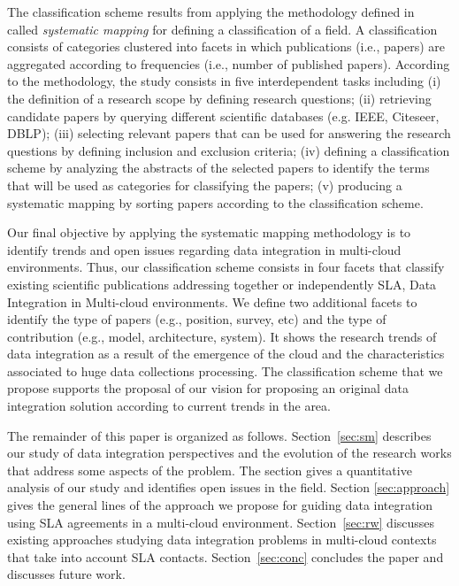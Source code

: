 The classification scheme results from  applying the  methodology defined in~\cite{SM:Petersen:2008} called  \textit{systematic mapping}  for defining a classification of a field. A classification consists of categories clustered into facets in which publications (i.e., papers) are aggregated according to frequencies (i.e., number of published papers). According to the methodology, the study consists in  five interdependent tasks including (i) the definition of a research scope by defining research questions; (ii) retrieving candidate papers by querying different scientific databases (e.g. IEEE, Citeseer, DBLP); (iii) selecting relevant papers that can be used for answering the research questions by defining inclusion and exclusion criteria; (iv) defining a classification scheme by analyzing the abstracts of the selected papers to identify the terms that will be used as categories for classifying the papers; (v) producing a systematic mapping by sorting papers according to the classification scheme. 

Our final objective by applying the systematic mapping methodology is to identify trends and open issues regarding data integration in multi-cloud environments. Thus, our classification scheme consists in four facets that classify existing scientific publications addressing  together or independently SLA, Data Integration in Multi-cloud environments. We define two additional facets to identify the type of papers (e.g., position, survey, etc) and the type of contribution (e.g., model, architecture, system). It shows the research trends of data integration as a result of the emergence of the cloud and the characteristics associated to huge data collections processing. The  classification scheme that we propose supports   the proposal of our vision for  proposing an original data integration solution according to current trends in the area. 


The remainder of this paper is organized as follows. 
Section~\ref{sec:sm} describes our study of  data integration perspectives and the evolution of the research works that address some aspects of the problem. The section gives a quantitative analysis of our study and identifies open issues in the field. Section \ref{sec:approach} gives the general lines of the approach we propose for guiding data integration using SLA agreements in a multi-cloud environment.  Section~\ref{sec:rw} discusses existing approaches studying data integration problems in multi-cloud contexts that take into account SLA contacts.
Section~\ref{sec:conc} concludes the paper and discusses future work. 


